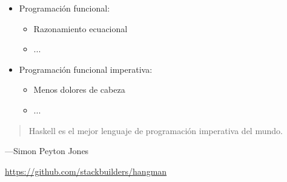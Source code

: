 \documentclass[spanish]{beamer}
\begin{document}
\begin{frame}
  \begin{itemize}
  \item Programación funcional:
    \begin{itemize}
    \item Razonamiento ecuacional
    \item ...
    \end{itemize}
  \item Programación funcional imperativa:
    \begin{itemize}
    \item Menos dolores de cabeza
    \item ...
    \end{itemize}
  \end{itemize}
\end{frame}


\begin{frame}
  \begin{quote}
    Haskell es el mejor lenguaje de programación imperativa del mundo.
  \end{quote}
  \hfill---Simon Peyton Jones
\end{frame}


\begin{frame}
  \begin{center}
    \url{https://github.com/stackbuilders/hangman}
  \end{center}
\end{frame}

\end{document}
